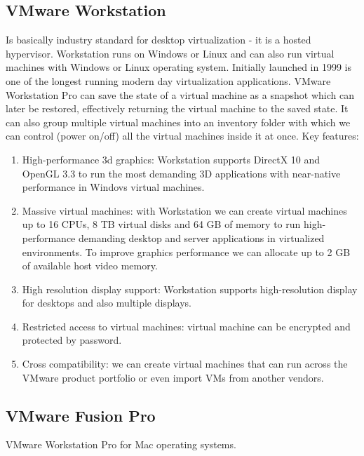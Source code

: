 \begin{enumerate}
\subsection{VMware Workstation}
Is basically industry standard for desktop virtualization - it is a hosted hypervisor. Workstation runs on Windows or Linux and can also run virtual machines with Windows or Linux operating system. Initially launched in 1999 is one of the longest running modern day virtualization applications. VMware Workstation Pro can save the state of a virtual machine as a snapshot which can later be restored, effectively returning the virtual machine to the saved state. It can also group multiple virtual machines into an inventory folder with which we can control (power on/off) all the virtual machines inside it at once.
Key features:
\begin{enumerate}
\item High-performance 3d graphics: Workstation supports DirectX 10 and OpenGL 3.3 to run the most demanding 3D applications with near-native performance in Windovs virtual machines.
\item Massive virtual machines: with Workstation we can create virtual machines up to 16 CPUs, 8 TB virtual disks and 64 GB of memory to run high-performance demanding desktop and server applications in virtualized environments. To improve graphics performance we can allocate  up to 2 GB of available host video memory.
\item High resolution display support: Workstation supports high-resolution display for desktops and also multiple displays.
\item Restricted access to virtual machines: virtual machine can be encrypted and protected by password.
\item Cross compatibility: we can create virtual machines that can run across the VMware product portfolio or even import VMs from another vendors.
\end{enumerate}

\subsection{VMware Fusion Pro}
VMware Workstation Pro for Mac operating systems.


\end{enumerate}
